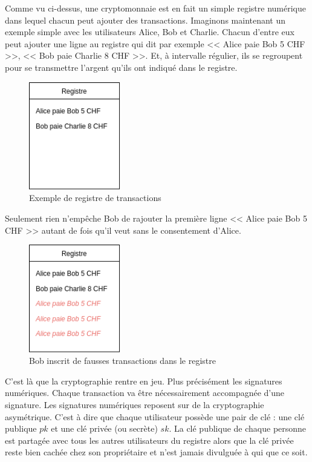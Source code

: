 Comme vu ci-dessus, une cryptomonnaie est en fait un simple registre numérique dans lequel chacun peut ajouter des transactions. Imaginons maintenant un exemple simple avec les utilisateurs Alice, Bob et Charlie. Chacun d'entre eux peut ajouter une ligne au registre qui dit par exemple << Alice paie Bob 5 CHF >>, << Bob paie Charlie 8 CHF >>. Et, à intervalle régulier, ils se regroupent pour se transmettre l'argent qu'ils ont indiqué dans le registre.

\begin{figure}[H]
  \centering
  \includegraphics[width=4cm]{images/crypto_1.png}
  \caption{Exemple de registre de transactions}
\end{figure}

Seulement rien n'empêche Bob de rajouter la première ligne << Alice paie Bob 5 CHF >> autant de fois qu'il veut sans le consentement d'Alice.

\begin{figure}[H]
  \centering
  \includegraphics[width=4cm]{images/crypto_2.png}
  \caption{Bob inscrit de fausses transactions dans le registre}
\end{figure}

C'est là que la cryptographie rentre en jeu. Plus précisément les signatures numériques. Chaque transaction va être nécessairement accompagnée d'une signature. Les signatures numériques reposent sur de la cryptographie asymétrique. C'est à dire que chaque utilisateur possède une pair de clé : une clé publique $pk$ et une clé privée (ou secrète) $sk$. La clé publique de chaque personne est partagée avec tous les autres utilisateurs du registre alors que la clé privée reste bien cachée chez son propriétaire et n'est jamais divulguée à qui que ce soit.

